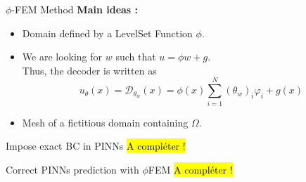 \begin{frame}{$\phi$-FEM Method}
	\textbf{Main ideas :} \small
	
	\begin{minipage}[t]{0.48\linewidth}
		\begin{itemize}[\textbullet]
			\item Domain defined by a LevelSet Function $\phi$.
		\end{itemize}
		\centering
	\end{minipage} \hfill
	\begin{minipage}[t]{0.48\linewidth}
		\begin{itemize}[\textbullet]
			\item We are looking for $w$ such that $u=\phi w+g$. \\
			Thus, the decoder is written as
			\begin{equation*}
				u_\theta(x)=\mathcal{D}_{\theta_w}(x) = \phi(x)\sum_{i=1}^{N}(\theta_w)_i\varphi_i+g(x)
			\end{equation*}
		\end{itemize}
	\end{minipage}

	\begin{itemize}[\textbullet]
		\item Mesh of a fictitious domain containing $\Omega$.
	\end{itemize}
	\begin{center}
		\begin{minipage}{0.43\linewidth}
			\centering
		\end{minipage} \hfill
		\begin{minipage}{0.1\linewidth}
			\centering
		\end{minipage} \hfill
		\begin{minipage}{0.43\linewidth}
			\centering
		\end{minipage}
	\end{center}
\end{frame}

\begin{frame}{Impose exact BC in PINNs}
	\hl{A compléter !}
\end{frame}

\begin{frame}{Correct PINNs prediction with $\phi$FEM}
	\hl{A compléter !}
\end{frame}